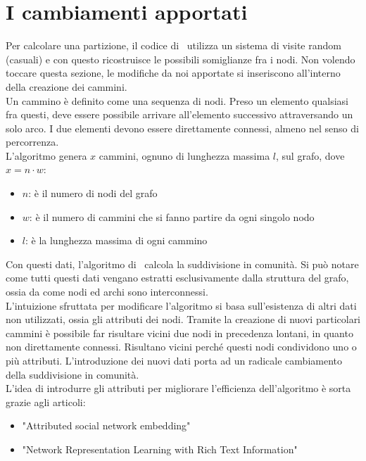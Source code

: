 \section{I cambiamenti apportati}
Per calcolare una partizione, il codice di \cnrl\ utilizza un sistema di visite random (casuali) e con questo ricostruisce le possibili somiglianze fra i nodi. Non volendo toccare questa sezione, le modifiche da noi apportate si inseriscono all'interno della creazione dei cammini.\\
Un cammino è definito come una sequenza di nodi. Preso un elemento qualsiasi fra questi, deve essere possibile arrivare all'elemento successivo attraversando un solo arco. I due elementi devono essere direttamente connessi, almeno nel senso di percorrenza.\\
L'algoritmo genera $x$ cammini, ognuno di lunghezza massima $l$, sul grafo, dove $x=n \cdot w$:
\begin{itemize}
	\item $n$: è il numero di nodi del grafo
	\item $w$: è il numero di cammini che si fanno partire da ogni singolo nodo
	\item $l$: è la lunghezza massima di ogni cammino
\end{itemize}
%
Con questi dati, l'algoritmo di \cnrl\ calcola la suddivisione in comunità. Si può notare come tutti questi dati vengano estratti esclusivamente dalla struttura del grafo, ossia da come nodi ed archi sono interconnessi.\\
L'intuizione sfruttata per modificare l'algoritmo si basa sull'esistenza di altri dati non utilizzati, ossia gli attributi dei nodi. Tramite la creazione di nuovi particolari cammini è possibile far risultare vicini due nodi in precedenza lontani, in quanto non direttamente connessi. Risultano vicini perché questi nodi condividono uno o più attributi. L'introduzione dei nuovi dati porta ad un radicale cambiamento della suddivisione in comunità.\\
L'idea di introdurre gli attributi per migliorare l'efficienza dell'algoritmo è sorta grazie agli articoli:
\begin{itemize}
	\item "Attributed social network embedding"\cite{SNE_paper}
	\item "Network Representation Learning with Rich Text Information"\cite{TADW_paper}
\end{itemize}
%
